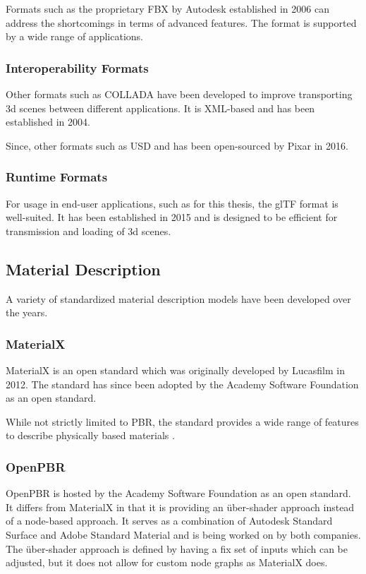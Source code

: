 Formats such as the proprietary FBX by Autodesk established in 2006 can address the shortcomings in terms of advanced features. The format is supported by a wide range of applications.

\subsubsection{Interoperability Formats}

Other formats such as COLLADA have been developed to improve transporting 3d scenes between different applications. It is XML-based and has been established in 2004.

Since, other formats such as USD and has been open-sourced by Pixar in 2016.

\subsubsection{Runtime Formats}

For usage in end-user applications, such as for this thesis, the glTF format is well-suited. It has been established in 2015 and is designed to be efficient for transmission and loading of 3d scenes.

\subsection{Material Description}

A variety of standardized material description models have been developed over the years.

\subsubsection{MaterialX}

MaterialX is an open standard which was originally developed by Lucasfilm in 2012. The standard has since been adopted by the Academy Software Foundation as an open standard.

While not strictly limited to PBR, the standard provides a wide range of features to describe physically based materials \cite{Harrysson2019}.

\subsubsection{OpenPBR}

OpenPBR is hosted by the Academy Software Foundation as an open standard. It differs from MaterialX in that it is providing an über-shader approach instead of a node-based approach. It serves as a combination of Autodesk Standard Surface and Adobe Standard Material and is being worked on by both companies. The über-shader approach is defined by having a fix set of inputs which can be adjusted, but it does not allow for custom node graphs as MaterialX does.
